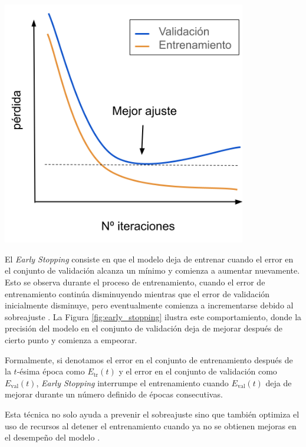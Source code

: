 \begin{minipage}{0.35\textwidth}
\centering
    \includegraphics[width=0.8\textwidth]{img/earlyStopping.png}
    \label{fig:early_stopping}
\end{minipage}
\begin{minipage}{0.6\textwidth}
     El \textit{Early Stopping} consiste en que el modelo deja de entrenar cuando el error en el conjunto de validación alcanza un mínimo y comienza a aumentar nuevamente. Esto se observa durante el proceso de entrenamiento, cuando el error de entrenamiento continúa disminuyendo mientras que el error de validación inicialmente disminuye, pero eventualmente comienza a incrementarse debido al sobreajuste \citep{geron2022hands}. La Figura \ref{fig:early_stopping} ilustra este comportamiento, donde la precisión del modelo en el conjunto de validación deja de mejorar después de cierto punto y comienza a empeorar.
     
\bigskip

Formalmente, si denotamos el error en el conjunto de entrenamiento después de la \( t \)-ésima época como \( E_{\text{tr}}(t) \) y el error en el conjunto de validación como \( E_{\text{val}}(t) \), \textit{Early Stopping} interrumpe el entrenamiento cuando \( E_{\text{val}}(t) \) deja de mejorar durante un número definido de épocas consecutivas. 
\end{minipage}


Esta técnica no solo ayuda a prevenir el sobreajuste sino que también optimiza el uso de recursos al detener el entrenamiento cuando ya no se obtienen mejoras en el desempeño del modelo \citep{tian2022comprehensive}.

